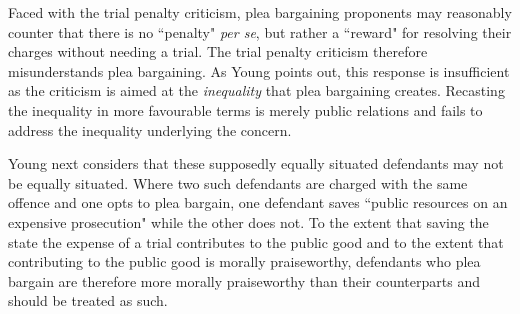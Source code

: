 Faced with the trial penalty criticism, plea bargaining proponents may reasonably counter that there is no ``penalty" \textit{per se}, but rather a ``reward" for resolving their charges without needing a trial. The trial penalty criticism therefore misunderstands plea bargaining. As Young points out, this response is insufficient as the criticism is aimed at the \textit{inequality} that plea bargaining creates. Recasting the inequality in more favourable terms is merely public relations and fails to address the inequality underlying the concern.

Young next considers that these supposedly equally situated defendants may not be equally situated. Where two such defendants are charged with the same offence and one opts to plea bargain, one defendant saves ``public resources on an expensive prosecution" while the other does not. To the extent that saving the state the expense of a trial contributes to the public good and to the extent that contributing to the public good is morally praiseworthy, defendants who plea bargain are therefore more morally praiseworthy than their counterparts and should be treated as such. 

